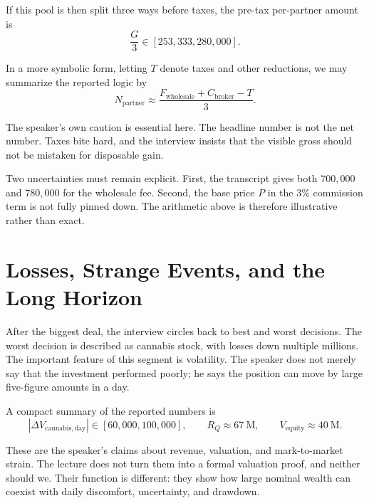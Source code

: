 If this pool is then split three ways before taxes, the pre-tax per-partner amount is
\begin{equation}
\frac{G}{3} \in [253{,}333,280{,}000].
\end{equation}

In a more symbolic form, letting \(T\) denote taxes and other reductions, we may summarize the reported logic by
\begin{equation}
N_{\mathrm{partner}} \approx \frac{F_{\mathrm{wholesale}} + C_{\mathrm{broker}} - T}{3}.
\end{equation}

The speaker's own caution is essential here. The headline number is not the net number. Taxes bite hard, and the interview insists that the visible gross should not be mistaken for disposable gain.

\begin{remark}
Two uncertainties must remain explicit. First, the transcript gives both \(700{,}000\) and \(780{,}000\) for the wholesale fee. Second, the base price \(P\) in the \(3\%\) commission term is not fully pinned down. The arithmetic above is therefore illustrative rather than exact.
\end{remark}

\section{Losses, Strange Events, and the Long Horizon}

After the biggest deal, the interview circles back to best and worst decisions. The worst decision is described as cannabis stock, with losses down multiple millions. The important feature of this segment is volatility. The speaker does not merely say that the investment performed poorly; he says the position can move by large five-figure amounts in a day.

A compact summary of the reported numbers is
\begin{equation}
|\Delta V_{\mathrm{cannabis,day}}| \in [60{,}000,100{,}000],
\qquad
R_Q \approx 67\ \mathrm{M},
\qquad
V_{\mathrm{equity}} \approx 40\ \mathrm{M}.
\end{equation}

These are the speaker's claims about revenue, valuation, and mark-to-market strain. The lecture does not turn them into a formal valuation proof, and neither should we. Their function is different: they show how large nominal wealth can coexist with daily discomfort, uncertainty, and drawdown.

